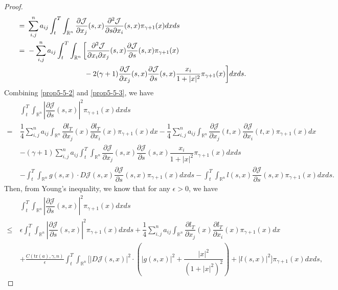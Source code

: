 \documentclass[11pt]{article}
\numberwithin{equation}{section}
\newcommand{\brn}{{\mathbb{R}^n}}
\newcommand{\1}{\mbox{1\hspace{-1mm}I}}
\begin{document}
\begin{proof}
\begin{align}
    =\ & \sum_{i,j}^n a_{ij} \int_{t}^{T}\int_{\brn}\dfrac{\partial\mathcal{J}}{\partial x_{j}}(s,x)\dfrac{\partial^2\mathcal{J}}{\partial s \partial x_{i}}(s,x)\pi_{\gamma+1}(x)dxds \notag \\
    =\ & - \sum_{i,j}^n a_{ij} \int_{t}^{T} \int_\brn \bigg[\dfrac{\partial^{2}\mathcal{J}}{\partial x_{i}\partial x_{j}}(s,x)\dfrac{\partial\mathcal{J}}{\partial s}(s,x)\pi_{\gamma+1}(x) \notag \\
    &\qquad\qquad\qquad\qquad - 2(\gamma+1) \dfrac{\partial\mathcal{J}}{\partial x_{j}}(s,x)\dfrac{\partial\mathcal{J}}{\partial s}(s,x)  \frac{x_i}{1+|x|^2}\pi_{\gamma+1}(x) \bigg]dxds. \label{prop5-5-3}
\end{align}
Combining \eqref{prop5-5-2} and \eqref{prop5-5-3}, we have
\begin{align*}
    &\int_{t}^{T}\int_{\brn}\left|\dfrac{\partial\mathcal{J}}{\partial s}(s,x)\right|^{2}\pi_{\gamma+1}(x)dxds \\
    =\ &\dfrac{1}{4}\sum_{i,j}^n a_{ij}\int_{\brn}\dfrac{\partial l_{T}}{\partial x_{j}}(x)\dfrac{\partial l_{T}}{\partial x_{i}}(x)\pi_{\gamma+1}(x)dx-\dfrac{1}{4}\sum_{i,j}^na_{ij}\int_{\brn}\dfrac{\partial\mathcal{J}}{\partial x_{j}}(t,x)\dfrac{\partial\mathcal{J}}{\partial x_{i}}(t,x)\pi_{\gamma+1}(x)dx\\
    &-(\gamma+1)\sum_{i,j}^n a_{ij}\int_{t}^{T}\int_{\brn}\dfrac{\partial\mathcal{J}}{\partial x_{j}}(s,x)\dfrac{\partial\mathcal{J}}{\partial s}(s,x)\dfrac{x_{i}}{1+|x|^{2}}\pi_{\gamma+1}(x)dxds\\
    &- \int_{t}^{T}\int_{\brn}g(s,x)\cdot D\mathcal{J}(s,x)\dfrac{\partial\mathcal{J}}{\partial s}(s,x)\pi_{\gamma+1}(x)dxds - \int_{t}^{T}\int_{\brn}l(s,x)\dfrac{\partial\mathcal{J}}{\partial s}(s,x)\pi_{\gamma+1}(x)dxds.
\end{align*}
Then, from Young's inequality, we know that for any $\epsilon>0$, we have
\begin{align*}
    &\int_{t}^{T}\int_{\brn}\left|\dfrac{\partial\mathcal{J}}{\partial s}(s,x)\right|^{2}\pi_{\gamma+1}(x)dxds \\
    \le\ & \epsilon \int_{t}^{T}\int_{\brn}\left|\dfrac{\partial\mathcal{J}}{\partial s}(s,x)\right|^{2}\pi_{\gamma+1}(x)dxds +\dfrac{1}{4}\sum_{i,j}^n a_{ij}\int_{\brn}\dfrac{\partial l_{T}}{\partial x_{j}}(x)\dfrac{\partial l_{T}}{\partial x_{i}}(x)\pi_{\gamma+1}(x)dx \\
    &+ \frac{C(\text{tr}(a),\gamma,n)}{\epsilon} \int_{t}^{T}\int_{\brn}\bigg[|D\mathcal{J}(s,x)|^2\cdot \left(|g(s,x)|^2+\dfrac{|x|^2}{\left(1+|x|^{2}\right)^2}\right) +|l(s,x)|^2 \bigg] \pi_{\gamma+1}(x)dxds,

\end{align*}
\end{proof}
\end{document}
